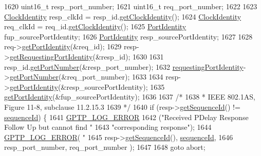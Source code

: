 \begin{DoxyCode}
{1620         uint16\_t resp\_port\_number;
1621         uint16\_t req\_port\_number;
1622 
1623         \hyperlink{class_clock_identity}{ClockIdentity} resp\_clkId = resp\_id.\hyperlink{class_port_identity_a6cfd51581c2881ac89d7ed113d798a87}{getClockIdentity}();
1624         \hyperlink{class_clock_identity}{ClockIdentity} req\_clkId = req\_id.\hyperlink{class_port_identity_a6cfd51581c2881ac89d7ed113d798a87}{getClockIdentity}();
1625         \hyperlink{class_port_identity}{PortIdentity} fup\_sourcePortIdentity;
1626         \hyperlink{class_port_identity}{PortIdentity} resp\_sourcePortIdentity;
1627 
1628         req->\hyperlink{class_p_t_p_message_common_a81caf27b0bcf771cb3c35d8fe42ae8ed}{getPortIdentity}(&req\_id);
1629         resp->\hyperlink{class_p_t_p_message_path_delay_resp_ada6cc047961dccdd3c4b2000b8da27b3}{getRequestingPortIdentity}(&resp\_id);
1630 
1631         resp\_id.\hyperlink{class_port_identity_ad9d12804c253a7c8138a4bfbe87eddba}{getPortNumber}(&resp\_port\_number);
1632         \hyperlink{class_p_t_p_message_path_delay_resp_follow_up_a27e69c7fb521ebffca13229a7c4658ce}{requestingPortIdentity}->\hyperlink{class_port_identity_ad9d12804c253a7c8138a4bfbe87eddba}{getPortNumber}(&req\_port\_number);
1633 
1634         resp->\hyperlink{class_p_t_p_message_common_a81caf27b0bcf771cb3c35d8fe42ae8ed}{getPortIdentity}(&resp\_sourcePortIdentity);
1635         \hyperlink{class_p_t_p_message_common_a81caf27b0bcf771cb3c35d8fe42ae8ed}{getPortIdentity}(&fup\_sourcePortIdentity);
1636 
1637         \textcolor{comment}{/*}
1638 \textcolor{comment}{        * IEEE 802.1AS, Figure 11-8, subclause 11.2.15.3}
1639 \textcolor{comment}{        */}
1640         \textcolor{keywordflow}{if} (resp->\hyperlink{class_p_t_p_message_common_abd5cac5701120cbbfc56129b31fa801f}{getSequenceId}() != \hyperlink{class_p_t_p_message_common_a189710d5cff10c03f77d72a276a5f58e}{sequenceId}) \{
1641             \hyperlink{gptp__log_8hpp_afefbb1009717c128012bfeed94842987}{GPTP\_LOG\_ERROR}
1642             (\textcolor{stringliteral}{"Received PDelay Response Follow Up but cannot find "}
1643                 \textcolor{stringliteral}{"corresponding response"});
1644             \hyperlink{gptp__log_8hpp_afefbb1009717c128012bfeed94842987}{GPTP\_LOG\_ERROR}( \textcolor{stringliteral}{"%
1645                     resp->\hyperlink{class_p_t_p_message_common_abd5cac5701120cbbfc56129b31fa801f}{getSequenceId}(), \hyperlink{class_p_t_p_message_common_a189710d5cff10c03f77d72a276a5f58e}{sequenceId},
1646                     resp\_port\_number, req\_port\_number );
1647 
1648             \textcolor{keywordflow}{goto} abort;
}}
\end{DoxyCode}
